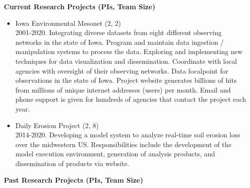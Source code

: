 \vspace*{0.25in}
\Large \bf Current Research Projects (PIs, Team Size)
\normalsize \sf
\begin{itemize}
\item Iowa Environmental Mesonet (2, 2)\\
2001-2020. Integrating diverse datasets from eight
different observing networks in the state of Iowa.  Program and maintain data
ingestion / manipulation systems to process the data. Exploring and implementing 
new techniques for data visualization and dissemination.  Coordinate with local
agencies with oversight of their observing networks.  Data focalpoint for 
observations in the state of Iowa. Project website generates billions of hits 
from millions of unique internet addresses (users) per month.  Email and 
phone support is given for hundreds of agencies that contact the project each
year.
\item Daily Erosion Project (2, 8)\\
2014-2020. Developing a model system to analyze real-time soil erosion loss over the 
midwestern US.  Responsibilities include the development of the model execution
environment, generation of analysis products, and dissemination of products 
via website.
\end{itemize}
\vspace*{0.25in}
\Large \bf Past Research Projects (PIs, Team Size)
\normalsize \sf
